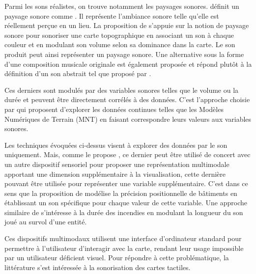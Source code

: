 \newpar{}


Parmi les sons réalistes, on trouve notamment les paysages sonores. \cite{Porteous1985} définit un paysage sonore comme . Il représente l'ambiance sonore telle qu'elle est réellement perçue en un lieu. La proposition de \cite{Josselin2016} s'appuie sur la notion de paysage sonore pour sonoriser une carte topographique en associant un son à chaque couleur et en modulant son volume selon sa dominance dans la carte. Le son produit peut ainsi représenter un paysage sonore. Une alternative sous la forme d'une composition musicale originale est également proposée et répond plutôt à la définition d'un son abstrait tel que proposé par \cite{Krygier1994}.


Ces derniers sont  modulés par des variables sonores telles que le volume ou la durée et peuvent être directement corrélés à des données. C'est l'approche choisie par \cite{Schito2018} qui proposent d'explorer les données continues telles que les Modèles Numériques de Terrain (MNT) en faisant correspondre leurs valeurs aux variables sonores.

\newpar{}


Les techniques évoquées ci-dessus visent à explorer des données par le son uniquement. Mais, comme le propose \cite{Krygier1994}, ce dernier peut être utilisé de concert avec un autre dispositif sensoriel pour proposer une représentation multimodale apportant une dimension supplémentaire à la visualisation, cette dernière pouvant être utilisée pour représenter une variable supplémentaire. C'est dans ce sens que la proposition de \cite{Bearman2010} modélise la précision positionnelle de bâtiments en établissant un son spécifique pour chaque valeur de cette variable. Une approche similaire de \cite{Foteinou2022} s'intéresse à la durée des incendies en modulant la longueur du son joué au survol d'une entité.

Ces dispositifs multimodaux utilisent une interface d'ordinateur standard pour permettre à l'utilisateur d'interagir avec la carte, rendant leur usage impossible par un utilisateur déficient visuel. Pour répondre à cette problématique, la littérature s'est intéressée à la sonorisation des cartes tactiles.

\newpar{}


